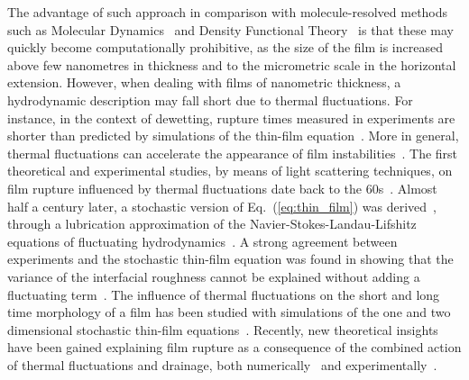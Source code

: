 The advantage of such approach in comparison with molecule-resolved methods such as Molecular Dynamics~\cite{haileMolecularDynamicsSimulation1997, zhangMolecularSimulationThin2019, wengMolecularDynamicsInvestigation2000, grabowThinFilmGrowth1988}
and Density Functional Theory~\cite{vanswolWettingDryingTransitions1989, tarazonaSimpleDensityFunctional1984, meisterDensityfunctionalTheoryInhomogeneous1985, hughesIntroductionInhomogeneousLiquids2014} is that these may quickly become computationally prohibitive, as the size of the film is increased above few nanometres in thickness and to the micrometric scale in the horizontal extension.
However, when dealing with films of nanometric thickness, a hydrodynamic description may fall short due to thermal fluctuations. 
For instance, in the context of dewetting, rupture times measured in experiments are shorter than predicted by simulations of the thin-film equation~\cite{bischofDewettingModesThin1996,herminghausSpinodalDewettingLiquid1998,beckerComplexDewettingScenarios2003}.
More in general, thermal fluctuations can accelerate the appearance of film instabilities~\cite{rauscherWettingPhenomenaNanofluidics2008,tsekovEffectThermalFluctuations1993, fetzerThermalNoiseInfluences2007, zhangMolecularSimulationThin2019}.
The first theoretical and experimental studies, by means of light scattering techniques, on film rupture influenced by thermal fluctuations date back to the 60s~\cite{vrijRuptureThinLiquid1968}.
Almost half a century later, a stochastic version of Eq.~(\ref{eq:thin_film}) was derived~\cite{grunThinFilmFlowInfluenced2006, meckeThermalFluctuationsThin2005, davidovitchSpreadingViscousFluid2005}, through a lubrication approximation of the Navier-Stokes-Landau-Lifshitz equations of fluctuating hydrodynamics~\cite{landauFluidMechanicsLandau2013}.
A strong agreement between experiments and the stochastic thin-film equation was found in showing that the variance of the interfacial roughness cannot be explained without adding a fluctuating term~\cite{fetzerThermalNoiseInfluences2007}.
The influence of thermal fluctuations on the short and long time morphology of a film has been studied with simulations of the one and two dimensional stochastic thin-film equations~\cite{nesicFullyNonlinearDynamics2015, pahlavanThinFilmsPartial2018}. 
Recently, new theoretical insights have been gained explaining film rupture as a consequence of the combined action of thermal fluctuations and drainage, both numerically~\cite{shahThermalFluctuationsCapillary2019} and experimentally~\cite{chatzigiannakisBreakupThinLiquid2020}.

